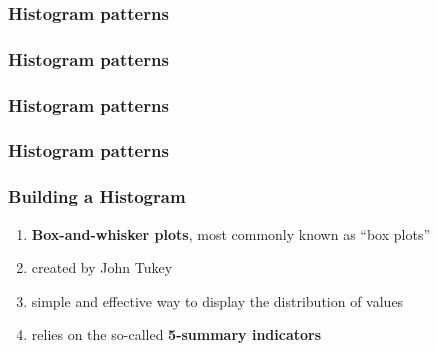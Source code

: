 \documentclass[12pt]{beamer}\usepackage[]{graphicx}\usepackage[]{color}
\begin{document}

\begin{frame}
\frametitle{Histogram patterns}
\begin{center}
\end{center}
\end{frame}


\begin{frame}
\frametitle{Histogram patterns}
\begin{center}
\end{center}
\end{frame}


\begin{frame}
\frametitle{Histogram patterns}
\begin{center}
\end{center}
\end{frame}


\begin{frame}
\frametitle{Histogram patterns}
\begin{center}
\end{center}
\end{frame}


\begin{frame}
\begin{center}
\Huge{}
\end{center}
\end{frame}


\begin{frame}
\frametitle{Building a Histogram}

\begin{enumerate}
  \item \textbf{Box-and-whisker plots}, most commonly known as ``box plots''
  \item created by John Tukey
  \item simple and effective way to display the distribution of values
  \item relies on the so-called \textbf{5-summary indicators}
\end{enumerate}

\end{frame}
\end{document}

